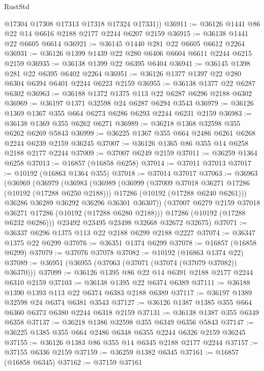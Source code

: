\begin{lexlean}{RustStd}
\begin{coremodule}
        @17304
        @17308
        @17313
        @17318
        @17324
        @17331))
@36911 := @36126 @1441 @86 @22 @14 @6616 @2188 @2177 @2244 @6207 @2159
@36915 := @36138 @1441 @22 @6605 @6614
@36921 := @36145 @1440 @281 @22 @6605 @6612 @2264
@36931 := @36126 @1399 @1439 @22 @280 @6406 @6604 @6611 @2244 @6215 @2159
@36935 := @36138 @1399 @22 @6395 @6404
@36941 := @36145 @1398 @281 @22 @6395 @6402 @2264
@36951 := @36126 @1377 @1397 @22 @280 @6304 @6394 @6401 @2244 @6223 @2159
@36955 := @36138 @1377 @22 @6287 @6302
@36963 := @36188 @1372 @1375 @113 @22 @6287 @6296 @2188 @6302
@36969 := @36197 @1371 @32598 @24 @6287 @6294 @3543
@36979 := @36126 @1369 @1367 @355 @664 @6273 @6286 @6293 @2244 @6231 @2159
@36983 := @36138 @1369 @355 @6262 @6271
@36989 := @36218 @1368 @32598 @355 @6262 @6269 @5843
@36999 := @36225 @1367 @355 @664 @2486 @6261 @6268 @2244 @6239 @2159 @36245
@37007 := @36126 @1365 @86 @355 @14 @6258 @2188 @2177 @2244
@37009 := @37007 @6249 @2159
@37011 := @36259 @1364 @6258
@37013 := @16857 (@16858 @6258)
@37014 := @37011 @37013
@37017 := @10192 (@16863 @1364 @355)
@37018 := @37014 @37017
@37063 := @36963
    (@36969
      (@36979
        (@36983
          (@36989
            (@36999
              (@37009 @37018 @36271 @17286 (@10192 (@17288 @6250 @2188)))
              @17286
              (@10192 (@17288 @6240 @6261)))
            @36286
            @36289
            @36292
            @36296
            @36301
            @36307))
        (@37007 @6279 @2159 @37018 @36271 @17286 (@10192 (@17288 @6280 @2188)))
        @17286
        (@10192 (@17288 @6232 @6286)))
      @23492
      @23495
      @23498
      @32668
      @32672
      @32675)
@37071 := @36337 @6296 @1375 @113 @22 @2188 @6299 @2188 @2227
@37074 := @36347 @1375 @22 @6299
@37076 := @36351 @1374 @6299
@37078 := @16857 (@16858 @6299)
@37079 := @37076 @37078
@37082 := @10192 (@16863 @1374 @22)
@37089 := @36951 (@36955 (@37063 (@37071 (@37074 (@37079 @37082)) @36370)))
@37099 := @36126 @1395 @86 @22 @14 @6391 @2188 @2177 @2244 @6310 @2159
@37103 := @36138 @1395 @22 @6374 @6389
@37111 := @36188 @1390 @1393 @113 @22 @6374 @6383 @2188 @6389
@37117 := @36197 @1389 @32598 @24 @6374 @6381 @3543
@37127 := @36126 @1387 @1385 @355 @664 @6360 @6373 @6380 @2244 @6318 @2159
@37131 := @36138 @1387 @355 @6349 @6358
@37137 := @36218 @1386 @32598 @355 @6349 @6356 @5843
@37147 := @36225 @1385 @355 @664 @2486 @6348 @6355 @2244 @6326 @2159 @36245
@37155 := @36126 @1383 @86 @355 @14 @6345 @2188 @2177 @2244
@37157 := @37155 @6336 @2159
@37159 := @36259 @1382 @6345
@37161 := @16857 (@16858 @6345)
@37162 := @37159 @37161

\end{coremodule}
\end{lexlean}
